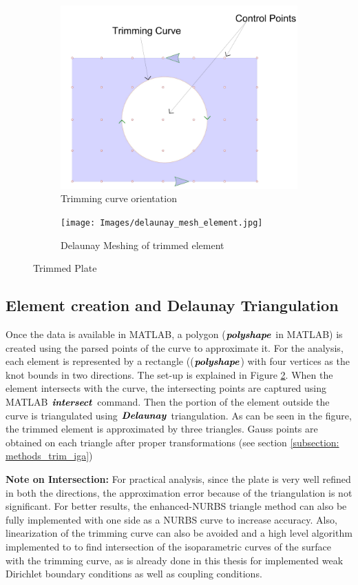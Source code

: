 \documentclass[12pt, a4paper]{report}
\begin{document}
\begin{figure}[H]
\centering
\begin{subfigure}{.5\textwidth}
  \centering
  \includegraphics[width=0.9\linewidth]{Images/trimDemo.png}
  \caption{Trimming curve orientation}
  \label{fig:tSurf}
\end{subfigure}%
\begin{subfigure}{.5\textwidth}
  \centering
  \texttt{[image: Images/delaunay\_mesh\_element.jpg]}
  \caption{Delaunay Meshing of trimmed element}
  \label{fig:Delaunay}
\end{subfigure}
\caption{Trimmed Plate }
\label{fig:trimmed plate}
\end{figure}
\subsection{Element creation and Delaunay Triangulation} Once the data is available in MATLAB, a polygon ($\textbf{\textit{polyshape}}$ in MATLAB) is created using the parsed points of the curve to approximate it.  For the analysis, each element is represented by a rectangle (($\textbf{\textit{polyshape}}$) with four vertices as the knot bounds in two directions. The set-up is explained in Figure \ref{fig:Delaunay}. When the element intersects with the curve, the intersecting points are captured using MATLAB $\textbf{\textit{intersect}}$ command. Then the portion of the element outside the curve is triangulated using $\textbf{\textit{Delaunay}}$ triangulation. As can be seen in the figure, the trimmed element is approximated by three triangles. Gauss points are obtained on each triangle after proper transformations (see section \ref{subsection: methods_trim_iga})\par
\textbf{Note on Intersection:} For practical analysis, since the plate is very well refined in both the directions, the approximation error because of the triangulation is not significant. For better results, the enhanced-NURBS triangle method can also be fully implemented with one side as a NURBS curve to increase accuracy. Also, linearization of the trimming curve can also be avoided and a high level algorithm implemented to to find intersection of the isoparametric curves of the surface with the trimming curve, as is already done in this thesis for implemented weak Dirichlet boundary conditions as well as coupling conditions.
\vspace{-10pt}
\end{document}
